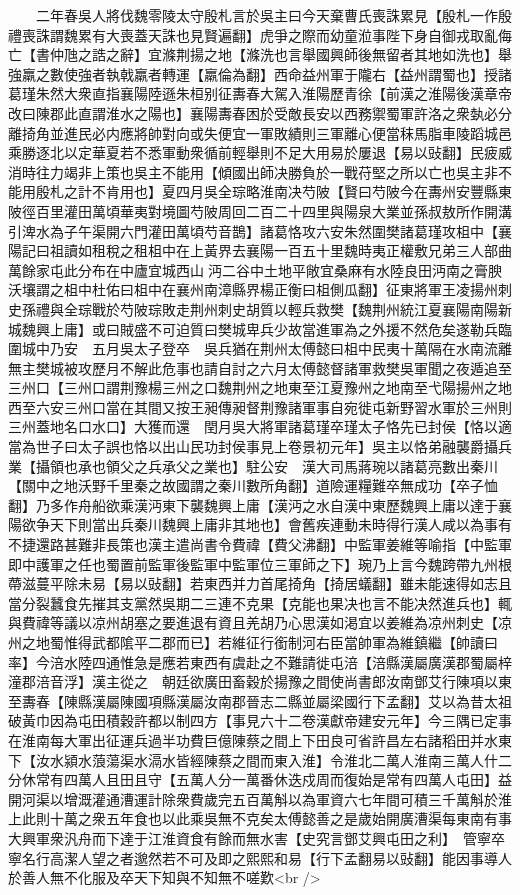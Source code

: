 　　二年春吳人將伐魏零陵太守殷札言於吳主曰今天棄曹氏喪誅累見【殷札一作殷禮喪誅謂魏累有大喪蓋天誅也見賢遍翻】虎爭之際而幼童涖事陛下身自御戎取亂侮亡【書仲虺之誥之辭】宜滌荆揚之地【滌洗也言舉國興師後無留者其地如洗也】舉強羸之數使強者執戟羸者轉運【羸倫為翻】西命益州軍于隴右【益州謂蜀也】授諸葛瑾朱然大衆直指襄陽陸遜朱桓别征夀春大駕入淮陽歷青徐【前漢之淮陽後漢章帝改曰陳郡此直謂淮水之陽也】襄陽夀春困於受敵長安以西務禦蜀軍許洛之衆埶必分離掎角並進民必内應將帥對向或失便宜一軍敗績則三軍離心便當秣馬脂車陵蹈城邑乘勝逐北以定華夏若不悉軍動衆循前輕舉則不足大用易於屢退【易以䜴翻】民疲威消時往力竭非上策也吳主不能用【傾國出師决勝負於一戰苻堅之所以亡也吳主非不能用殷札之計不肯用也】夏四月吳全琮略淮南决芍陂【賢曰芍陂今在夀州安豐縣東陂徑百里灌田萬頃華夷對境圖芍陂周回二百二十四里與陽泉大業並孫叔敖所作開溝引渒水為子午渠開六門灌田萬頃芍音鵲】諸葛恪攻六安朱然圍樊諸葛瑾攻柤中【襄陽記曰祖讀如租稅之租柤中在上黃界去襄陽一百五十里魏時夷正權敷兄弟三人部曲萬餘家屯此分布在中廬宜城西山沔二谷中土地平敞宜桑麻有水陸良田沔南之膏腴沃壤謂之柤中杜佑曰柤中在襄州南漳縣界楊正衡曰柤側瓜翻】征東將軍王凌揚州刺史孫禮與全琮戰於芍陂琮敗走荆州刺史胡質以輕兵救樊【魏荆州統江夏襄陽南陽新城魏興上庸】或曰賊盛不可迫質曰樊城卑兵少故當進軍為之外援不然危矣遂勒兵臨圍城中乃安　五月吳太子登卒　吳兵猶在荆州太傅懿曰柤中民夷十萬隔在水南流離無主樊城被攻歷月不解此危事也請自討之六月太傅懿督諸軍救樊吳軍聞之夜遁追至三州口【三州口謂荆豫楊三州之口魏荆州之地東至江夏豫州之地南至弋陽揚州之地西至六安三州口當在其間又按王昶傳昶督荆豫諸軍事自宛徙屯新野習水軍於三州則三州蓋地名口水口】大獲而還　閏月吳大將軍諸葛瑾卒瑾太子恪先已封侯【恪以適當為世子曰太子誤也恪以出山民功封侯事見上卷景初元年】吳主以恪弟融襲爵攝兵業【攝領也承也領父之兵承父之業也】駐公安　漢大司馬蔣琬以諸葛亮數出秦川【關中之地沃野千里秦之故國謂之秦川數所角翻】道險運糧難卒無成功【卒子恤翻】乃多作舟船欲乘漢沔東下襲魏興上庸【漢沔之水自漢中東歷魏興上庸以達于襄陽欲争天下則當出兵秦川魏興上庸非其地也】會舊疾連動未時得行漢人咸以為事有不捷還路甚難非長策也漢主遣尚書令費禕【費父沸翻】中監軍姜維等喻指【中監軍即中護軍之任也蜀置前監軍後監軍中監軍位三軍師之下】琬乃上言今魏跨帶九州根蔕滋蔓平除未易【易以䜴翻】若東西并力首尾掎角【掎居蟻翻】雖未能速得如志且當分裂蠶食先摧其支黨然吳期二三連不克果【克能也果决也言不能决然進兵也】輒與費禕等議以凉州胡塞之要進退有資且羌胡乃心思漢如渇宜以姜維為凉州刺史【凉州之地蜀惟得武都隂平二郡而已】若維征行銜制河右臣當帥軍為維鎮繼【帥讀曰率】今涪水陸四通惟急是應若東西有虞赴之不難請徙屯涪【涪縣漢屬廣漢郡蜀屬梓潼郡涪音浮】漢主從之　朝廷欲廣田畜穀於揚豫之間使尚書郎汝南鄧艾行陳項以東至夀春【陳縣漢屬陳國項縣漢屬汝南郡晉志二縣並屬梁國行下孟翻】艾以為昔太祖破黃巾因為屯田積穀許都以制四方【事見六十二卷漢獻帝建安元年】今三隅已定事在淮南每大軍出征運兵過半功費巨億陳蔡之間上下田良可省許昌左右諸稻田并水東下【汝水潁水蒗蕩渠水滆水皆經陳蔡之間而東入淮】令淮北二萬人淮南三萬人什二分休常有四萬人且田且守【五萬人分一萬番休迭戍周而復始是常有四萬人屯田】益開河渠以增溉灌通漕運計除衆費歲完五百萬斛以為軍資六七年間可積三千萬斛於淮上此則十萬之衆五年食也以此乘吳無不克矣太傅懿善之是歲始開廣漕渠每東南有事大興軍衆汎舟而下達于江淮資食有餘而無水害【史究言鄧艾興屯田之利】　管寧卒寧名行高潔人望之者邈然若不可及即之熙熙和易【行下孟翻易以䜴翻】能因事導人於善人無不化服及卒天下知與不知無不嗟歎<br />
